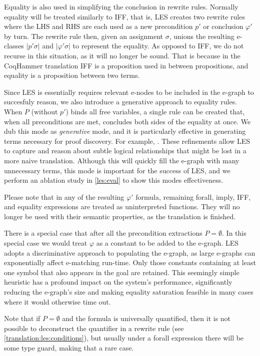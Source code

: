 Equality is also used in simplifying the conclusion in rewrite rules.
Normally equality will be treated similarly to IFF, that is, LES creates two rewrite rules where the LHS and RHS are each used as a new precondition $p'$ or conclusion $\varphi'$ by turn.
The rewrite rule then, given an assignment $\sigma$, unions the resulting e-classes $|p'\sigma|$ and $|\varphi'\sigma|$ to represent the equality.
As opposed to IFF, we do not recurse in this situation, as it will no longer be sound.
That is because in the CoqHammer translation IFF is a proposition used in between propositions, and equality is a proposition between two terms.

Since LES is essentially requires relevant e-nodes to be included in the e-graph to succesfuly reason, we also introduce a generative approach to equality rules.
When $P$ (without $p'$) binds all free variables, a single rule can be created that, when all preconditions are met, concludes both sides of the equality at once. 
We dub this mode as \emph{generative} mode, and it is particularly effective in generating terms necessary for proof discovery. 
For example, .
These refinements allow LES to capture and reason about subtle logical relationships that might be lost in a more naive translation.
Although this will quickly fill the e-graph with many unnecessary terms, this mode is important for the success of LES, and we perform an ablation study in \autoref{les:eval} to show this modes effectiveness.

Please note that in any of the resulting $\varphi'$ formula, remaining forall, imply, IFF, and equality expressions are treated as uninterpreted functions.
They will no longer be used with their semantic properties, as the translation is finished.

There is a special case that after all the precondition extractions $P = \emptyset$.
In this special case we would treat $\varphi$ as a constant to be added to the e-graph.
LES adopts a discriminative approach to populating the e-graph, as large e-graphs can exponentially affect e-matching run-time.
Only those constants containing at least one symbol that also appears in the goal are retained.
This seemingly simple heuristic has a profound impact on the system's performance, significantly reducing the e-graph's size and making equality saturation feasible in many cases where it would otherwise time out.

Note that if $P = \emptyset$ and the formula is universally quantified, then it is not possible to deconstruct the quantifier in a rewrite rule (see \autoref{translation:les:conditions}), but usually under a forall expression there will be some type guard, making that a rare case.

